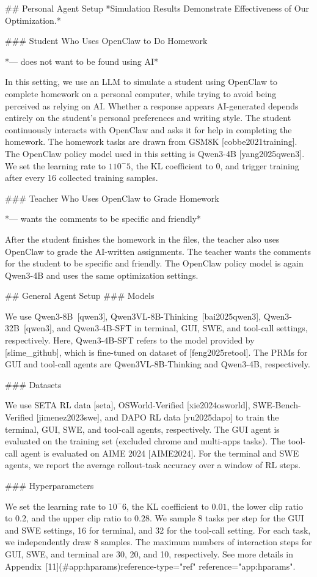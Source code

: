 ## Personal Agent Setup
*Simulation Results Demonstrate Effectiveness of Our Optimization.*

### Student Who Uses OpenClaw to Do Homework

*--- does not want to be found using AI*

In this setting, we use an LLM to simulate a student using OpenClaw to complete homework on a personal computer, while trying to avoid being perceived as relying on AI. Whether a response appears AI-generated depends entirely on the student's personal preferences and writing style. The student continuously interacts with OpenClaw and asks it for help in completing the homework. The homework tasks are drawn from GSM8K [cobbe2021training]. The OpenClaw policy model used in this setting is Qwen3-4B [yang2025qwen3]. We set the learning rate to $110^-5$, the KL coefficient to $0$, and trigger training after every 16 collected training samples.

### Teacher Who Uses OpenClaw to Grade Homework

*--- wants the comments to be specific and friendly*

After the student finishes the homework in the files, the teacher also uses OpenClaw to grade the AI-written assignments. The teacher wants the comments for the student to be specific and friendly. The OpenClaw policy model is again Qwen3-4B and uses the same optimization settings.

## General Agent Setup
### Models

We use Qwen3-8B [qwen3], Qwen3VL-8B-Thinking [bai2025qwen3], Qwen3-32B [qwen3], and Qwen3-4B-SFT in terminal, GUI, SWE, and tool-call settings, respectively. Here, Qwen3-4B-SFT refers to the model provided by [slime_github], which is fine-tuned on dataset of [feng2025retool]. The PRMs for GUI and tool-call agents are Qwen3VL-8B-Thinking and Qwen3-4B, respectively.

### Datasets

We use SETA RL data [seta], OSWorld-Verified [xie2024osworld], SWE-Bench-Verified [jimenez2023swe], and DAPO RL data [yu2025dapo] to train the terminal, GUI, SWE, and tool-call agents, respectively. The GUI agent is evaluated on the training set (excluded chrome and multi-apps tasks). The tool-call agent is evaluated on AIME 2024 [AIME2024]. For the terminal and SWE agents, we report the average rollout-task accuracy over a window of RL steps.

### Hyperparameters

We set the learning rate to $10^-6$, the KL coefficient to $0.01$, the lower clip ratio to $0.2$, and the upper clip ratio to $0.28$. We sample 8 tasks per step for the GUI and SWE settings, 16 for terminal, and 32 for the tool-call setting. For each task, we independently draw 8 samples. The maximum numbers of interaction steps for GUI, SWE, and terminal are 30, 20, and 10, respectively. See more details in Appendix [11](#app:hparams)reference-type="ref" reference="app:hparams".

